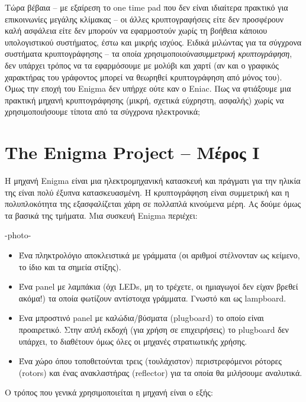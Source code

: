 \documentclass[a4paper,twoside,12pt]{article}
\begin{document}
Τώρα βέβαια – με εξαίρεση το one time pad που δεν είναι ιδιαίτερα πρακτικό για επικοινωνίες μεγάλης κλίμακας – οι άλλες κρυπτογραφήσεις  είτε δεν προσφέρουν καλή ασφάλεια είτε δεν μπορούν να εφαρμοστούν χωρίς τη βοήθεια κάποιου υπολογιστικού συστήματος, έστω και μικρής ισχύος. Ειδικά μιλώντας για τα σύγχρονα συστήματα κρυπτογράφησης – τα οποία χρησιμοποιούν\emph{ασυμμετρική κρυπτογράφηση}, δεν υπάρχει τρόπος να τα εφαρμόσουμε με μολύβι και χαρτί (αν και ο γραφικός χαρακτήρας του γράφοντος μπορεί να θεωρηθεί κρυπτογράφηση από μόνος του). Όμως την εποχή του Enigma δεν υπήρχε ούτε καν ο Eniac. Πως να φτιάξουμε μια πρακτική μηχανή κρυπτογράφησης (μικρή, σχετικά εύχρηστη, ασφαλής) χωρίς να χρησιμοποιήσουμε τίποτα από τα σύγχρονα ηλεκτρονικά;

\section{The Enigma Project -- Μέρος I}

Η μηχανή Enigma είναι μια ηλεκτρομηχανική κατασκευή και πράγματι για την ηλικία της είναι πολύ έξυπνα κατασκευασμένη. Η κρυπτογράφηση είναι συμμετρική και η πολυπλοκότητα της εξασφαλίζεται χάρη σε πολλαπλά κινούμενα μέρη.
Ας δούμε όμως τα βασικά της τμήματα. Μια συσκευή Enigma περιέχει:

-photo-

\begin{itemize}
\item Ένα πληκτρολόγιο αποκλειστικά με γράμματα (οι αριθμοί στέλνονταν ως κείμενο, το ίδιο και τα σημεία στίξης).
\item Ένα panel με λαμπάκια (όχι LEDs, μη το τρέχετε, οι ημιαγωγοί δεν είχαν βρεθεί ακόμα!) τα οποία φωτίζουν αντίστοιχα γράμματα. Γνωστό και ως lampboard.
\item Ενα μπροστινό panel με καλώδια/βύσματα (plugboard) το οποίο είναι προαιρετικό. Στην απλή εκδοχή (για χρήση σε επιχειρήσεις) το plugboard δεν υπάρχει, το διαθέτουν όμως όλες οι μηχανές στρατιωτικής χρήσης.
\item Ένα χώρο όπου τοποθετούνται τρεις (τουλάχιστον) περιστρεφόμενοι ρότορες (rotors) και ένας ανακλαστήρας (reflector) για τα οποία θα μιλήσουμε αναλυτικά.
\end{itemize}

Ο τρόπος που γενικά χρησιμοποιείται η μηχανή είναι ο εξής:
\end{document}
